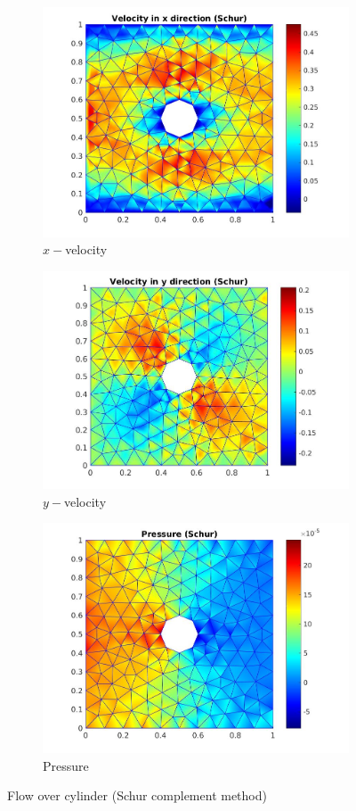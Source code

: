 \documentclass[a4paper,twoside,openright]{book}
\begin{document}
\begin{figure}
\begin{subfigure}{\textwidth}	
    \includegraphics[width=0.8\linewidth]{cylinder_schur_vx.jpg}
    \caption{$x-$velocity}
    \label{x_vel_stoke_schur}
\end{subfigure}
\begin{subfigure}{\textwidth}	
    \includegraphics[width=0.8\linewidth]{cylinder_schur_vy.jpg}
    \caption{$y-$velocity}
     \label{y_vel_stoke_schur}
\end{subfigure}
\begin{subfigure}{\textwidth}	
    \includegraphics[width=0.8\linewidth]{cylinder_schur_pressure.jpg}
    \caption{Pressure}
      \label{pressure_stoke_schur}
\end{subfigure}
\caption{Flow over cylinder (Schur complement method)}
\label{flow_over_cylinder_schur}
\end{figure}
\end{document}
